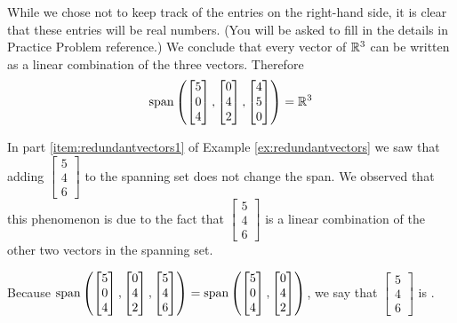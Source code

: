 \documentclass{ximera}
\begin{document}
\begin{example}
\begin{explanation}
 While we chose not to keep track of the entries on the right-hand side, it is clear that these entries will be real numbers. (You will be asked to fill in the details in Practice Problem {\color{red} reference}.)  We conclude that every vector of $\mathbb{R}^3$ can be written as a linear combination of the three vectors.  Therefore 
 $$\textnormal{span}\left(\begin{bmatrix}5\\0\\4\end{bmatrix}, \begin{bmatrix}0\\4\\2\end{bmatrix},\begin{bmatrix}4\\5\\0\end{bmatrix}\right)=\mathbb{R}^3$$
\end{explanation}
\end{example}

In part \ref{item:redundantvectors1} of Example \ref{ex:redundantvectors} we saw that adding $\begin{bmatrix}5\\4\\6\end{bmatrix}$ to the spanning set does not change the span.  We observed that this phenomenon is due to the fact that $\begin{bmatrix}5\\4\\6\end{bmatrix}$ is a linear combination of the other two vectors in the spanning set.

Because
$\textnormal{span}\left(\begin{bmatrix}5\\0\\4\end{bmatrix}, \begin{bmatrix}0\\4\\2\end{bmatrix},\begin{bmatrix}5\\4\\6\end{bmatrix}\right)=\textnormal{span}\left(\begin{bmatrix}5\\0\\4\end{bmatrix}, \begin{bmatrix}0\\4\\2\end{bmatrix}\right)$,
we say that $\begin{bmatrix}5\\4\\6\end{bmatrix}$ is .  
\end{document}
